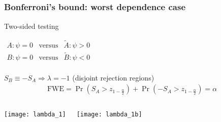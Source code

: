 \subsection{}
\begin{frame}
\frametitle{Bonferroni's bound: worst dependence case} 

\textcolor{cambridgedarkorange}{Two-sided testing}

\bigskip

$\begin{array}{ccc}
    A: \psi = 0 & \mathrm{versus} &  \tilde{A}:  \psi>0\\ 
    B: \psi = 0 & \mathrm{versus}   &  \tilde{B}: \psi<0\\ 
\end{array}$

\bigskip

\textcolor{cambridgedarkorange}{$S_{B}\equiv -S_A\Rightarrow \lambda = -1$ (disjoint rejection regions)}
\begin{eqnarray*}
\mathrm{FWE}=\Pr\left(S_A > z_{1-\frac{\alpha}{2}} \right) + \Pr\left(-S_A > z_{1-\frac{\alpha}{2}} \right) = \alpha
\end{eqnarray*}

\begin{columns}[t]

\centering
\texttt{[image: lambda\_1]}

\centering
\texttt{[image: lambda\_1b]}
\end{columns}


\end{frame}
